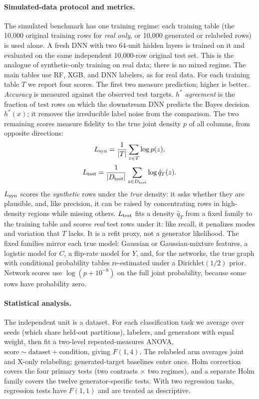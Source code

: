 \documentclass[letterpaper]{article}
\begin{document}
\paragraph{Simulated-data protocol and metrics.} The simulated benchmark has
one training regime: each training table (the 10,000 original training
rows for \emph{real only}, or 10,000 generated or relabeled rows) is used
alone. A fresh DNN with two 64-unit hidden layers is trained on it and
evaluated on the same independent 10,000-row original test set. This is the
analogue of synthetic-only training on real data; there is no mixed regime.
The main tables use RF, XGB, and DNN labelers, as for real data. For each
training table $T$ we report four scores. The first two measure prediction; higher is
better.
\emph{Accuracy} is measured against the observed test targets.
\emph{$h^*$ agreement} is the fraction of test rows on which the downstream
DNN predicts the Bayes decision $h^*(x)$; it removes the irreducible label
noise from the comparison. The two remaining scores measure fidelity to
the true joint density $p$ of all columns, from opposite directions:
\begin{equation}
 L_{\rm syn}=\frac1{|T|}\sum_{z\in T}\log p(z),
\end{equation}
\begin{equation}
 L_{\rm test}=\frac1{|D_{\rm test}|}\sum_{z\in D_{\rm test}}\log\hat q_T(z).
\end{equation}
$L_{\rm syn}$ scores the \emph{synthetic} rows under the \emph{true}
density: it asks whether they are plausible, and, like precision, it can
be raised by concentrating rows in high-density regions while missing
others. $L_{\rm test}$ fits a density $\hat q_T$ from a fixed family to the
training table and scores \emph{real} test rows under it: like recall, it
penalizes modes and variation that $T$ lacks. It is a refit proxy, not a
generator likelihood. The fixed families mirror each true model: Gaussian or
Gaussian-mixture features, a logistic model for $C$, a flip-rate model for
$Y$, and, for the networks, the true graph with conditional probability
tables re-estimated under a Dirichlet$(1/2)$ prior. Network scores use
$\log(p+10^{-8})$ on the full joint probability, because some rows have
probability zero.

\paragraph{Statistical analysis.} The independent unit is a dataset. For
each classification task we average over seeds (which share held-out
partitions), labelers, and generators with equal weight, then fit a
two-level repeated-measures ANOVA, $\mathrm{score}\sim\mathrm{dataset}+
\mathrm{condition}$, giving $F(1,4)$. The relabeled arm averages joint and
X-only relabeling; generated-target baselines enter once. Holm correction
covers the four primary tests (two contrasts $\times$ two regimes), and a
separate Holm family covers the twelve generator-specific tests. With two
regression tasks, regression tests have $F(1,1)$ and are treated as
descriptive.
\end{document}
